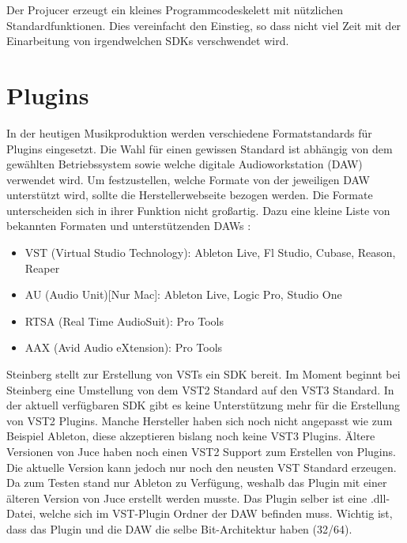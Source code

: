 Der Projucer erzeugt ein kleines Programmcodeskelett mit nützlichen Standardfunktionen. Dies vereinfacht den Einstieg, so dass nicht viel Zeit mit der Einarbeitung von irgendwelchen SDKs verschwendet wird.

\section{Plugins}

In der heutigen Musikproduktion werden verschiedene Formatstandards für Plugins eingesetzt. Die Wahl für einen gewissen Standard ist abhängig von dem gewählten Betriebssystem sowie welche digitale Audioworkstation (DAW) verwendet wird. Um festzustellen, welche Formate von der jeweiligen DAW unterstützt wird, sollte die Herstellerwebseite bezogen werden. Die Formate unterscheiden sich in ihrer Funktion nicht großartig. Dazu eine kleine Liste von bekannten Formaten und unterstützenden DAWs \cite{PF}:

\begin{itemize}
	\item VST (Virtual Studio Technology): Ableton Live, Fl Studio, Cubase, Reason, Reaper
	\item AU (Audio Unit)[Nur Mac]: Ableton Live, Logic Pro, Studio One 
	\item RTSA (Real Time AudioSuit): Pro Tools
	\item AAX (Avid Audio eXtension): Pro Tools
\end{itemize}

Steinberg stellt zur Erstellung von VSTs ein SDK bereit. Im Moment beginnt bei Steinberg eine Umstellung von dem VST2 Standard auf den VST3 Standard. In der aktuell verfügbaren SDK gibt es keine Unterstützung mehr für die Erstellung von VST2 Plugins. Manche Hersteller haben sich noch nicht angepasst wie zum Beispiel Ableton, diese akzeptieren bislang noch keine VST3 Plugins. Ältere Versionen von Juce haben noch einen VST2 Support zum Erstellen von Plugins. Die aktuelle Version kann jedoch nur noch den neusten VST Standard erzeugen.
Da zum Testen stand nur Ableton zu Verfügung, weshalb das Plugin mit einer älteren Version von Juce erstellt werden musste. Das Plugin selber ist eine .dll-Datei, welche sich im VST-Plugin Ordner der DAW befinden muss. Wichtig ist, dass das Plugin und die DAW die selbe Bit-Architektur haben (32/64).